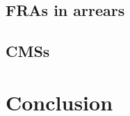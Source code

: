 \documentclass[a4paper,10pt]{article}
\newcommand{\1}{\mathbf{1}}
\begin{document}
\subsection{FRAs in arrears}

\subsection{CMSs}

\section{Conclusion}\label{sec:Conclusion}




%
\end{document}
